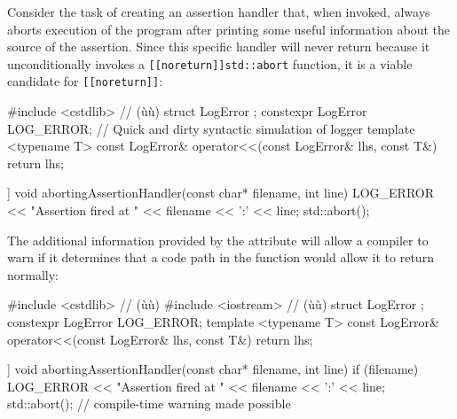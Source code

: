 Consider the task of creating an assertion handler that, when invoked,
always aborts execution of the program after printing some useful
information about the source of the assertion. Since this specific
handler will never return because it unconditionally invokes a \linebreak[4]%
\mbox{\lstinline![[noreturn]]std::abort!} function, it is a viable candidate for
\lstinline![[noreturn]]!:

\begin{emcppshiddenlisting}[emcppsbatch=e2]
#include <cstdlib>  // (ù{}ù)
struct LogError {};
constexpr LogError LOG_ERROR; // Quick and dirty syntactic simulation of logger
template <typename T>
const LogError& operator<<(const LogError& lhs, const T&) { return lhs; }
\end{emcppshiddenlisting}
\begin{emcppslisting}[emcppsbatch=e2]
[[noreturn]] void abortingAssertionHandler(const char* filename, int line)
{
    LOG_ERROR << "Assertion fired at " << filename << ':' << line;
    std::abort();
}
\end{emcppslisting}


\noindent The additional information provided by the attribute will allow a
compiler to warn if it determines that a code path in the
function would allow it to return normally:

\begin{emcppshiddenlisting}[emcppsbatch=e3]
#include <cstdlib>   // (ù{}ù)
#include <iostream>  // (ù{}ù)
struct LogError {};
constexpr LogError LOG_ERROR;
template <typename T>
const LogError& operator<<(const LogError& lhs, const T&) { return lhs; }
\end{emcppshiddenlisting}
\begin{emcppslisting}[emcppsbatch=e3]
[[noreturn]] void abortingAssertionHandler(const char* filename, int line)
{
    if (filename)
    {
        LOG_ERROR << "Assertion fired at " << filename << ':' << line;
        std::abort();
    }
}  // compile-time warning made possible
\end{emcppslisting}



